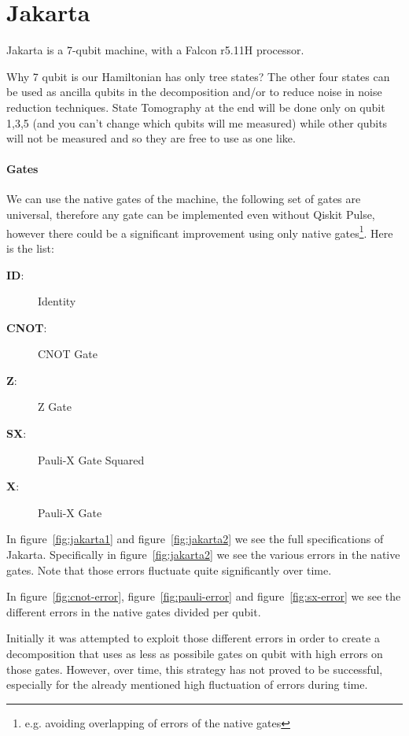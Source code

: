 \section{Jakarta}\label{sec:jakarta}
Jakarta is a 7-qubit machine, with a Falcon r5.11H processor. 

Why 7 qubit is our Hamiltonian has only tree states? 
The other four states can be used as ancilla qubits in the decomposition and/or to reduce noise in noise reduction techniques. State Tomography at the end will be done only on qubit 1,3,5 (and you can't change which qubits will me measured) while other qubits will not be measured and so they are free to use as one like.

\paragraph{Gates}
We can use the native gates of the machine, the following set of gates are universal, therefore any gate can be implemented even without Qiskit Pulse, however there could be a significant improvement using only native gates\footnote{e.g. avoiding overlapping of errors of the native gates}. Here is the list:
   \begin{description}
    \item[\textbf{ID}: ] Identity
    \item[\textbf{CNOT}: ] CNOT Gate
    \item[\textbf{Z}: ] Z Gate
    \item[\textbf{SX}: ] Pauli-X Gate Squared
    \item[\textbf{X}: ] Pauli-X Gate
   \end{description}

In figure~\ref{fig:jakarta1} and figure~\ref{fig:jakarta2} we see the full specifications of Jakarta. Specifically in figure~\ref{fig:jakarta2} we see the various errors in the native gates. Note that those errors fluctuate quite significantly over time.

In figure~\ref{fig:cnot-error}, figure~\ref{fig:pauli-error} and figure~\ref{fig:sx-error} we see the different errors in the native gates divided per qubit. 

Initially it was attempted to exploit those different errors in order to create a decomposition that uses as less as possibile gates on qubit with high errors on those gates. However, over time, this strategy has not proved to be successful, especially for the already mentioned high fluctuation of errors during time.
    
